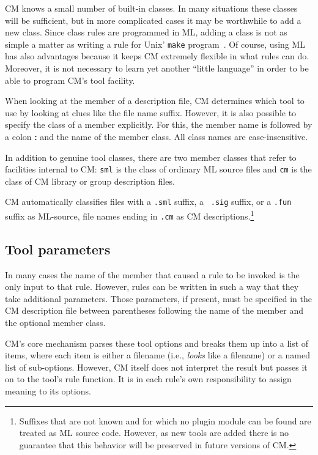 \documentclass[titlepage,letterpaper]{article}
\begin{document}
CM knows a small number of built-in classes.  In many situations these
classes will be sufficient, but in more complicated cases it may be
worthwhile to add a new class.  Since class rules are programmed in
ML, adding a class is not as simple a matter as writing a rule for
{\sc Unix}' {\tt make} program~\cite{feldman79}.  Of course,
using ML has also advantages because it keeps CM extremely flexible in
what rules can do.  Moreover, it is not necessary to learn yet another
``little language'' in order to be able to program CM's tool facility.

When looking at the member of a description file, CM determines which
tool to use by looking at clues like the file name suffix.  However,
it is also possible to specify the class of a member explicitly.  For
this, the member name is followed by a colon {\bf :} and the name of
the member class.  All class names are case-insensitive.

In addition to genuine tool classes, there are two member classes
that refer to facilities internal to CM: {\tt sml} is the class of
ordinary ML source files and {\tt cm} is the class of CM library or
group description files.

CM automatically classifies files with a {\tt .sml} suffix, a {\tt
.sig} suffix, or a {\tt .fun} suffix as ML-source, file names ending
in {\tt .cm} as CM descriptions.\footnote{Suffixes that are not known
and for which no plugin module can be found are treated as ML source
code.  However, as new tools are added there is no guarantee that
this behavior will be preserved in future versions of CM.}

\subsection{Tool parameters}
\label{sec:toolparam}

In many cases the name of the member that caused a rule to be invoked
is the only input to that rule.  However, rules can be written in such
a way that they take additional parameters.  Those parameters, if
present, must be specified in the CM description file between
parentheses following the name of the member and the optional member
class.

CM's core mechanism parses these tool options and breaks them up into
a list of items, where each item is either a filename (i.e., {\em
looks} like a filename) or a named list of sub-options.  However, CM
itself does not interpret the result but passes it on to the tool's
rule function.  It is in each rule's own responsibility to assign
meaning to its options.
\end{document}
